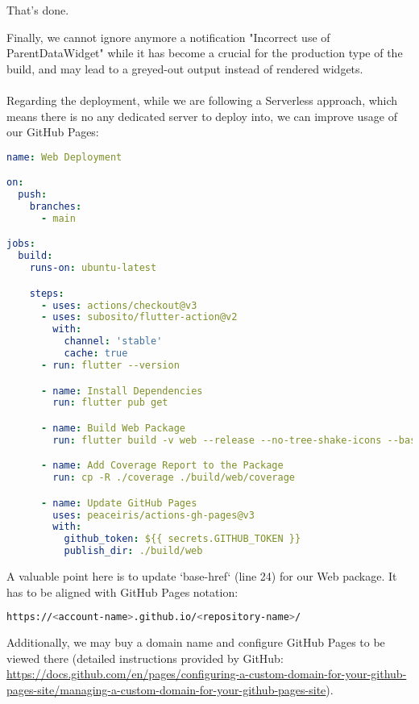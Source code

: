 \noindent That's done.

Finally, we cannot ignore anymore a notification "Incorrect use of ParentDataWidget" while it has become a crucial for 
the production type of the build, and may lead to a greyed-out output instead of rendered widgets.\\
\\

Regarding the deployment, while we are following a Serverless approach, which means there is no any dedicated server to 
deploy into, we can improve usage of our GitHub Pages:

\begin{lstlisting}[language=yaml]
name: Web Deployment

on:
  push:
    branches:
      - main

jobs:
  build:
    runs-on: ubuntu-latest

    steps:
      - uses: actions/checkout@v3
      - uses: subosito/flutter-action@v2
        with:
          channel: 'stable'
          cache: true
      - run: flutter --version

      - name: Install Dependencies
        run: flutter pub get

      - name: Build Web Package
        run: flutter build -v web --release --no-tree-shake-icons --base-href="/app-finance/"

      - name: Add Coverage Report to the Package
        run: cp -R ./coverage ./build/web/coverage

      - name: Update GitHub Pages 
        uses: peaceiris/actions-gh-pages@v3
        with:
          github_token: ${{ secrets.GITHUB_TOKEN }}
          publish_dir: ./build/web
\end{lstlisting}

\noindent A valuable point here is to update `base-href` (line 24) for our Web package. It has to be aligned with 
GitHub Pages notation:

\begin{lstlisting}[language=bash]
https://<account-name>.github.io/<repository-name>/
\end{lstlisting}

Additionally, we may buy a domain name and configure GitHub Pages to be viewed there (detailed instructions provided by
GitHub: \href{https://docs.github.com/en/pages/configuring-a-custom-domain-for-your-github-pages-site/managing-a-custom-domain-for-your-github-pages-site}{https://docs.github.com/en/pages/configuring-a-custom-domain-for-your-github-pages-site/managing-a-custom-domain-for-your-github-pages-site}).
